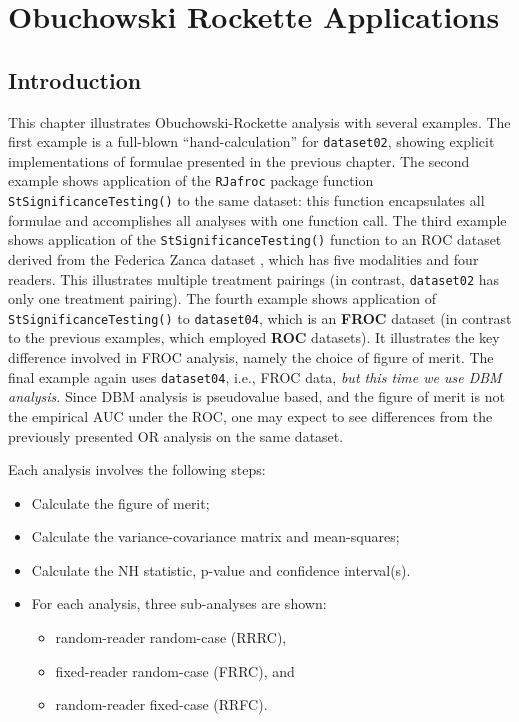 \documentclass[
]{book}
\providecommand{\tightlist}{%
  \setlength{\itemsep}{0pt}\setlength{\parskip}{0pt}}
\begin{document}
\hypertarget{ORApplications}{%
\chapter{Obuchowski Rockette Applications}\label{ORApplications}}

\hypertarget{ORApplications-introduction}{%
\section{Introduction}\label{ORApplications-introduction}}

This chapter illustrates Obuchowski-Rockette analysis with several examples. The first example is a full-blown ``hand-calculation'' for \texttt{dataset02}, showing explicit implementations of formulae presented in the previous chapter. The second example shows application of the \texttt{RJafroc} package function \texttt{StSignificanceTesting()} to the same dataset: this function encapsulates all formulae and accomplishes all analyses with one function call. The third example shows application of the \texttt{StSignificanceTesting()} function to an ROC dataset derived from the Federica Zanca dataset \citep{RN1882}, which has five modalities and four readers. This illustrates multiple treatment pairings (in contrast, \texttt{dataset02} has only one treatment pairing). The fourth example shows application of \texttt{StSignificanceTesting()} to \texttt{dataset04}, which is an \textbf{FROC} dataset (in contrast to the previous examples, which employed \textbf{ROC} datasets). It illustrates the key difference involved in FROC analysis, namely the choice of figure of merit. The final example again uses \texttt{dataset04}, i.e., FROC data, \emph{but this time we use DBM analysis}. Since DBM analysis is pseudovalue based, and the figure of merit is not the empirical AUC under the ROC, one may expect to see differences from the previously presented OR analysis on the same dataset.

Each analysis involves the following steps:

\begin{itemize}
\tightlist
\item
  Calculate the figure of merit;
\item
  Calculate the variance-covariance matrix and mean-squares;
\item
  Calculate the NH statistic, p-value and confidence interval(s).
\item
  For each analysis, three sub-analyses are shown:

  \begin{itemize}
  \tightlist
  \item
    random-reader random-case (RRRC),
  \item
    fixed-reader random-case (FRRC), and
  \item
    random-reader fixed-case (RRFC).
  \end{itemize}
\end{itemize}
\end{document}
